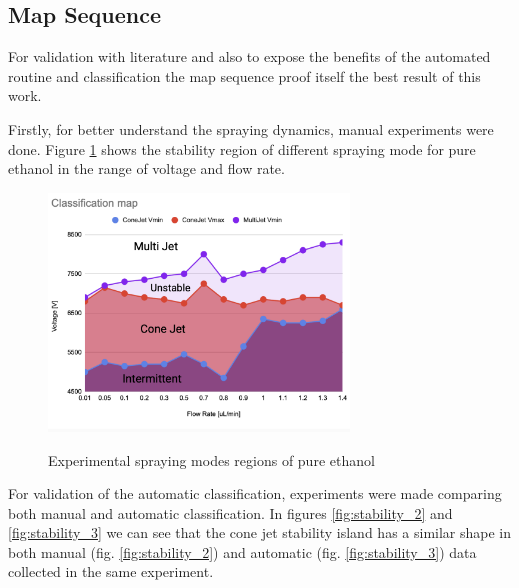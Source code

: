 \subsection{Map Sequence}
\label{subsec:map_results}

For validation with literature and also to expose the benefits of the automated routine and classification the map sequence proof itself the best result of this work.



    Firstly, for better understand the spraying dynamics, manual experiments were done.
    Figure \ref{fig:stability_1} shows the stability region of different spraying mode for pure ethanol in the range of voltage and flow rate.

    \begin{figure}[H]
        \center
        \includegraphics[width=8cm]{Figuras/regions.png}
        \label{fig:stability_1}
        \caption{Experimental spraying modes regions of pure ethanol}
    \end{figure}


    For validation of the automatic classification, experiments were made comparing both manual and automatic classification.
    In figures \ref{fig:stability_2} and \ref{fig:stability_3} we can see that the cone jet stability island has a similar shape in both manual (fig. \ref{fig:stability_2}) and automatic (fig. \ref{fig:stability_3}) data collected in the same experiment.

